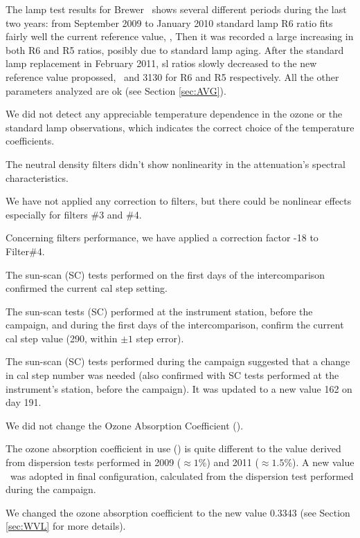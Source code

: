 The lamp test results for Brewer \brwname\ shows several different periods during the last two years: from September 2009 to January 2010 standard lamp R6 ratio fits fairly well the current reference value, \slref, Then it was recorded a large increasing in both R6 and R5 ratios, posibly due to standard lamp aging. After the standard lamp replacement in February 2011, sl ratios slowly decreased to the new reference value propossed, \slrefNEW\ and 3130 for R6 and R5 respectively. All the other parameters analyzed are ok (see Section \ref{sec:AVG}).

We did not detect any appreciable temperature dependence in the ozone or the standard lamp observations, which indicates the correct choice of the temperature coefficients.


The neutral density filters didn't show nonlinearity in the attenuation's spectral characteristics.

We have not applied any correction to filters, but there could be nonlinear effects especially for filters \#3 and \#4.

Concerning filters performance, we have applied a correction factor -18 to Filter\#4.

The sun-scan (SC) tests performed on the first days of the intercomparison confirmed the current cal step setting.

The sun-scan tests (SC) performed at the instrument station, before the campaign, and during the first days of the intercomparison, confirm the current cal step value (290, within $\pm1$ step error).

The sun-scan (SC) tests performed during the campaign suggested that a change in cal step number was needed (also confirmed with SC tests performed at the instrument's station, before the campaign). It was updated to a new value 162 on day 191.

We did not change the Ozone Absorption Coefficient (\Aorig).

The ozone absorption coefficient in use (\Aorig) is quite different to the value derived from dispersion tests performed in 2009 ($\approx 1$\%) and 2011 ($\approx 1.5$\%). A new value \Adef\ was adopted in final configuration, calculated from the dispersion test performed during the campaign.

We changed the ozone absorption coefficient to the new value 0.3343 (see Section \ref{sec:WVL} for more details).

